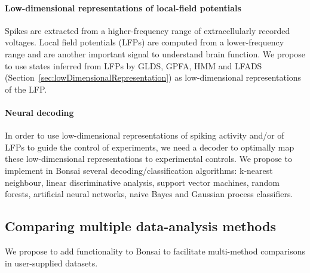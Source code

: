 \paragraph{Low-dimensional representations of local-field potentials}
\label{sec:lowDimensionalRepresentationsOfLFPs}

Spikes are extracted from a higher-frequency range of extracellularly recorded
voltages. Local field potentials (LFPs) are computed from a lower-frequency
range and are another important signal to understand brain function. We propose
to use states inferred from LFPs by GLDS, GPFA, HMM and LFADS
(Section~\ref{sec:lowDimensionalRepresentation}) as
low-dimensional representations of the LFP.

\paragraph{Neural decoding}
\label{sec:neuralDecoding}

In order to use low-dimensional representations of spiking activity and/or of
LFPs to guide the control of experiments, we need a decoder to optimally map
these low-dimensional representations to experimental controls.
%
We propose to implement in Bonsai several decoding/classification algorithms:
k-nearest neighbour, linear discriminative analysis, support vector machines,
random forests, artificial neural networks, naive Bayes and Gaussian process
classifiers.

\subsection{Comparing multiple data-analysis methods}
\label{sec:comparisonOfMultipleMethods}

We propose to add functionality to Bonsai to facilitate multi-method
comparisons in user-supplied datasets.


